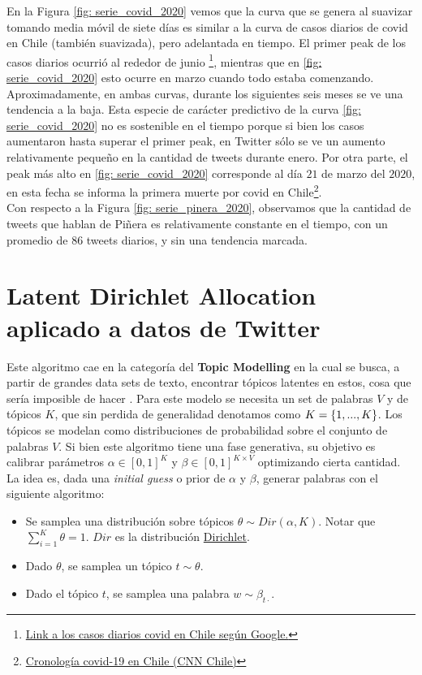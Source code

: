\documentclass{article}
\begin{document}
En la Figura \ref{fig: serie_covid_2020} vemos que la curva que se genera al suavizar tomando media móvil de siete días es similar a la curva de casos diarios de covid en Chile (también suavizada), pero adelantada en tiempo. El primer peak de los casos diarios ocurrió al rededor de junio \footnote{\href{https://www.google.com/search?client=firefox-b-d&q=covid+chile}{Link a los casos diarios covid en Chile según Google.}}, mientras que en \ref{fig: serie_covid_2020} esto ocurre en marzo cuando todo estaba comenzando. Aproximadamente, en ambas curvas, durante los siguientes seis meses se ve una tendencia a la baja. Esta especie de carácter predictivo de la curva \ref{fig: serie_covid_2020} no es sostenible en el tiempo porque si bien los casos aumentaron hasta superar el primer peak, en Twitter sólo se ve un aumento relativamente pequeño en la cantidad de tweets durante enero. Por otra parte, el peak más alto en \ref{fig: serie_covid_2020} corresponde al día $21$ de marzo del $2020$, en esta fecha se informa la primera muerte por covid en Chile\footnote{\href{https://www.cnnchile.com/coronavirus/hitos-claves-covid-19-chile-mundo-cronologia_20200505/}{Cronología covid-19 en Chile (CNN Chile)}}.\\

Con respecto a la Figura \ref{fig: serie_pinera_2020}, observamos que la cantidad de tweets que hablan de Piñera es relativamente constante en el tiempo, con un promedio de $86$ tweets diarios, y sin una tendencia marcada. 


\section{Latent Dirichlet Allocation aplicado a datos de Twitter}
	Este algoritmo cae en la categoría del \textbf{Topic Modelling} en la cual se busca, a partir de grandes data sets de texto, encontrar tópicos latentes en estos, cosa que sería imposible de hacer . Para este modelo se necesita un set de palabras $V$ y de tópicos $K$, que sin perdida de generalidad denotamos como $K=\left\{1,...,K\right\}$. Los tópicos se modelan como distribuciones de probabilidad sobre el conjunto de palabras $V$. Si bien este algoritmo tiene una fase generativa, su objetivo es calibrar parámetros $\alpha\in [0,1]^{K}$ y $\beta\in[0,1]^{K\times V}$ optimizando cierta cantidad. La idea es, dada una \textit{initial guess} o prior de $\alpha$ y $\beta$, generar palabras con el siguiente algoritmo:
	
	\begin{itemize}
		\item Se samplea una distribución sobre tópicos $\theta\sim Dir(\alpha, K)$. Notar que $\sum_{i=1}^K \theta = 1$. $Dir$ es la distribución \href{https://en.wikipedia.org/wiki/Dirichlet_distribution}{Dirichlet}.
		\item Dado $\theta$, se samplea un tópico $t\sim\theta$.
		\item Dado el tópico $t$, se samplea una palabra $w\sim\beta_{t\cdot}$.
	\end{itemize}
	
\end{document}
